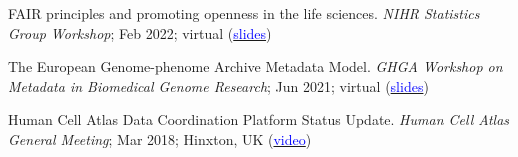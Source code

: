 \documentclass[margin,line]{res}
\begin{document}
\begin{resume}
FAIR principles and promoting openness in the life sciences. {\em NIHR Statistics Group Workshop}; Feb 2022; virtual (\href{https://docs.google.com/presentation/d/1BNdhj_Ny7qJ84xmoUuzqIicYXF3UwwcGdJTLtyZkV5I/edit?usp=sharing}{\textcolor{blue}{slides}})

The European Genome-phenome Archive Metadata Model. {\em GHGA Workshop on Metadata in Biomedical Genome Research}; Jun 2021; virtual (\href{https://docs.google.com/presentation/d/14x9PNs3j5mNZWIHBW9k6aiJUekiLYsrbrkpaMihB4ko/edit?usp=sharing}{\textcolor{blue}{slides}})



Human Cell Atlas Data Coordination Platform Status Update. {\em Human Cell Atlas General Meeting}; Mar 2018; Hinxton, UK (\href{https://youtu.be/NrYH9Oc6Cyk}{\textcolor{blue}{video}})








\end{resume}
\end{document}
